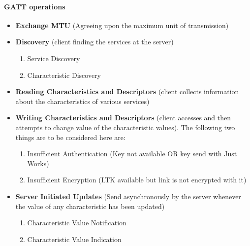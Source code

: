\paragraph{GATT operations}
\begin{itemize}
	\item \textbf{Exchange MTU} (Agreeing upon the maximum unit of transmission)
	\item \textbf{Discovery} (client finding the services at the server)
		\begin{enumerate}
			\item Service Discovery
			\item Characteristic Discovery
		\end{enumerate}
	\item \textbf{Reading Characteristics and Descriptors} (client collects information about the characteristics of various services)
	\item \textbf{Writing Characteristics and Descriptors} (client accesses and then attempts to change value of the characteristic values). The following two things are to be considered here are:
		\begin{enumerate}
			\item Insufficient Authentication (Key not available OR key send with Just Works)
			\item Insufficient Encryption (LTK available but link is not encrypted with it)
		\end{enumerate}
	\item \textbf{Server Initiated Updates} (Send asynchronously by the server whenever the value of any characteristic has been updated)
		\begin{enumerate}
			\item Characteristic Value Notification
			\item Characteristic Value Indication
		\end{enumerate}
\end{itemize}
